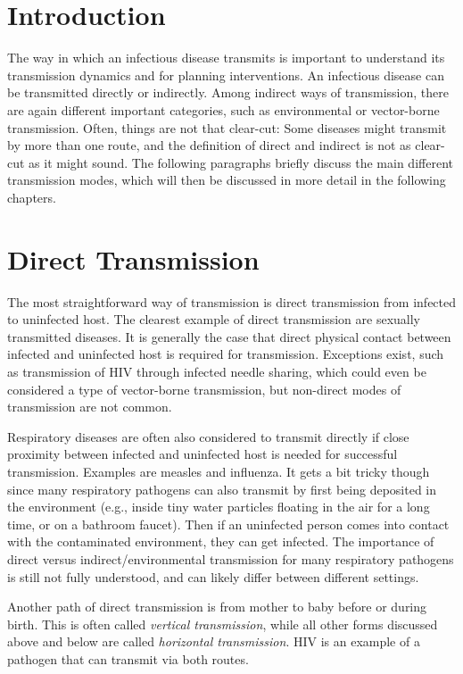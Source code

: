 \documentclass[]{book}
\theoremstyle{definition}
\theoremstyle{definition}
\theoremstyle{definition}
\theoremstyle{remark}
\begin{document}
\hypertarget{introduction-3}{%
\section{Introduction}\label{introduction-3}}

The way in which an infectious disease transmits is important to
understand its transmission dynamics and for planning interventions. An
infectious disease can be transmitted directly or indirectly. Among
indirect ways of transmission, there are again different important
categories, such as environmental or vector-borne transmission. Often,
things are not that clear-cut: Some diseases might transmit by more than
one route, and the definition of direct and indirect is not as clear-cut
as it might sound. The following paragraphs briefly discuss the main
different transmission modes, which will then be discussed in more
detail in the following chapters.

\hypertarget{direct-transmission}{%
\section{Direct Transmission}\label{direct-transmission}}

The most straightforward way of transmission is direct transmission from
infected to uninfected host. The clearest example of direct transmission
are sexually transmitted diseases. It is generally the case that direct
physical contact between infected and uninfected host is required for
transmission. Exceptions exist, such as transmission of HIV through
infected needle sharing, which could even be considered a type of
vector-borne transmission, but non-direct modes of transmission are not
common.

Respiratory diseases are often also considered to transmit directly if
close proximity between infected and uninfected host is needed for
successful transmission. Examples are measles and influenza. It gets a
bit tricky though since many respiratory pathogens can also transmit by
first being deposited in the environment (e.g., inside tiny water
particles floating in the air for a long time, or on a bathroom faucet).
Then if an uninfected person comes into contact with the contaminated
environment, they can get infected. The importance of direct versus
indirect/environmental transmission for many respiratory pathogens is
still not fully understood, and can likely differ between different
settings.

Another path of direct transmission is from mother to baby before or
during birth. This is often called \emph{vertical transmission}, while
all other forms discussed above and below are called \emph{horizontal
transmission}. HIV is an example of a pathogen that can transmit via
both routes.
\end{document}
